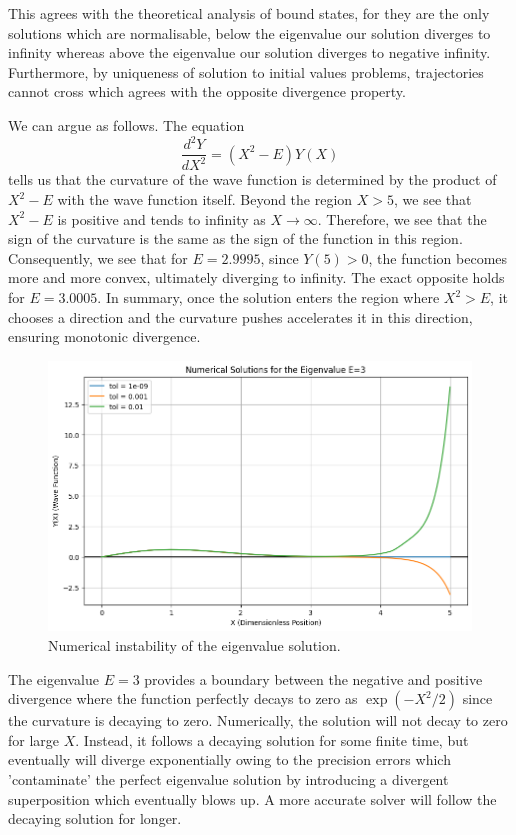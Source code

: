 \documentclass{article}
\begin{document}
This agrees with the theoretical analysis of bound states, for they are the only solutions which are normalisable, below the eigenvalue our solution diverges to infinity whereas above the eigenvalue our solution diverges to negative infinity. Furthermore, by uniqueness of solution to initial values problems, trajectories cannot cross which agrees with the opposite divergence property.

We can argue as follows. The equation
\[ \frac{d^2Y}{dX^2} = (X^2 - E)Y(X) \]
tells us that the curvature of the wave function is determined by the product of \(X^2 - E\) with the wave function itself. Beyond the region \(X > 5\), we see that \(X^2 - E\) is positive and tends to infinity as \(X \to \infty\). Therefore, we see that the sign of the curvature is the same as the sign of the function in this region. Consequently, we see that for \(E = 2.9995\), since \(Y(5) > 0\), the function becomes more and more convex, ultimately diverging to infinity. The exact opposite holds for \(E = 3.0005\). In summary, once the solution enters the region where \(X^2 > E\), it chooses a direction and the curvature pushes accelerates it in this direction, ensuring monotonic divergence.

\begin{figure}
    \centering
    \includegraphics[width=1\linewidth]{images/harmonic_2.png}
    \caption{Numerical instability of the eigenvalue solution.}
\end{figure}

The eigenvalue \(E = 3\) provides a boundary between the negative and positive divergence where the function perfectly decays to zero as \(\exp(-X^2/2)\) since the curvature is decaying to zero. Numerically, the solution will not decay to zero for large \(X\). Instead, it follows a decaying solution for some finite time, but eventually will diverge exponentially owing to the precision errors which 'contaminate' the perfect eigenvalue solution by introducing a divergent superposition which eventually blows up. A more accurate solver will follow the decaying solution for longer.
\end{document}
